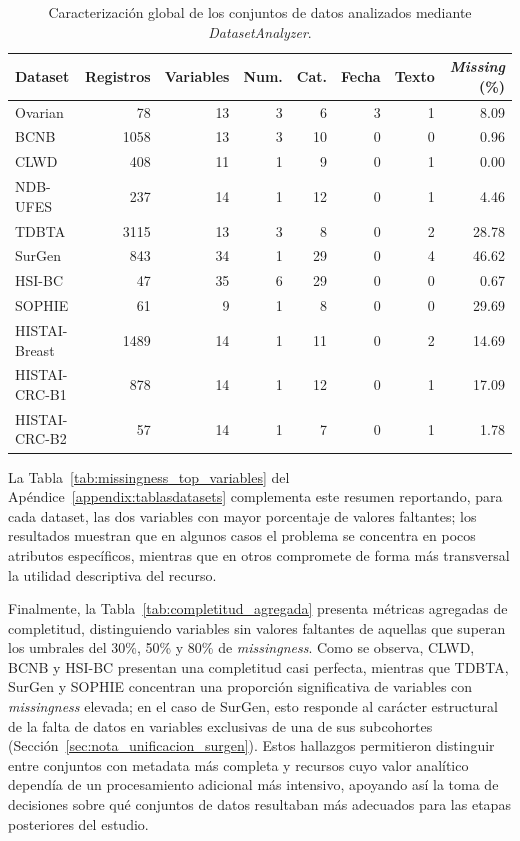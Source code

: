\begin{table}[htbp]
\centering
\caption{Caracterización global de los conjuntos de datos analizados mediante \textit{DatasetAnalyzer}.}
\label{tab:dataset_global_summary}
\small
\setlength{\tabcolsep}{6pt}
\begin{tabular}{lrrrrrrr}
\toprule
Dataset & Registros & Variables & Num. & Cat. & Fecha & Texto & \textit{Missing} (\%) \\
\midrule
Ovarian        & 78    & 13 & 3 & 6  & 3 & 1 & 8.09 \\
BCNB           & 1058  & 13 & 3 & 10 & 0 & 0 & 0.96 \\
CLWD           & 408   & 11 & 1 & 9  & 0 & 1 & 0.00 \\
NDB-UFES       & 237   & 14 & 1 & 12 & 0 & 1 & 4.46 \\
TDBTA          & 3115  & 13 & 3 & 8  & 0 & 2 & 28.78 \\
SurGen           & 843   & 34 & 1 & 29 & 0 & 4 & 46.62 \\
HSI-BC       & 47    & 35 & 6 & 29 & 0 & 0 & 0.67 \\
SOPHIE         & 61    & 9  & 1 & 8  & 0 & 0 & 29.69 \\
HISTAI-Breast  & 1489  & 14  & 1 & 11  & 0 & 2 & 14.69 \\
HISTAI-CRC-B1 & 878 & 14  & 1 & 12  & 0 & 1 & 17.09 \\
HISTAI-CRC-B2 & 57 & 14  & 1 & 7  & 0 & 1 & 1.78 \\
\bottomrule
\end{tabular}
\end{table}

La Tabla~\ref{tab:missingness_top_variables} del Apéndice~\ref{appendix:tablasdatasets} complementa este resumen reportando, para cada dataset, las dos variables con mayor porcentaje de valores faltantes; los resultados muestran que en algunos casos el problema se concentra en pocos atributos específicos, mientras que en otros compromete de forma más transversal la utilidad descriptiva del recurso.

Finalmente, la Tabla~\ref{tab:completitud_agregada} presenta métricas agregadas de completitud, distinguiendo variables sin valores faltantes de aquellas que superan los umbrales del 30\%, 50\% y 80\% de \textit{missingness}. Como se observa, CLWD, BCNB y HSI-BC presentan una completitud casi perfecta, mientras que TDBTA, SurGen y SOPHIE concentran una proporción significativa de variables con \textit{missingness} elevada; en el caso de SurGen, esto responde al carácter estructural de la falta de datos en variables exclusivas de una de sus subcohortes (Sección~\ref{sec:nota_unificacion_surgen}). Estos hallazgos permitieron distinguir entre conjuntos con metadata más completa y recursos cuyo valor analítico dependía de un procesamiento adicional más intensivo, apoyando así la toma de decisiones sobre qué conjuntos de datos resultaban más adecuados para las etapas posteriores del estudio.

